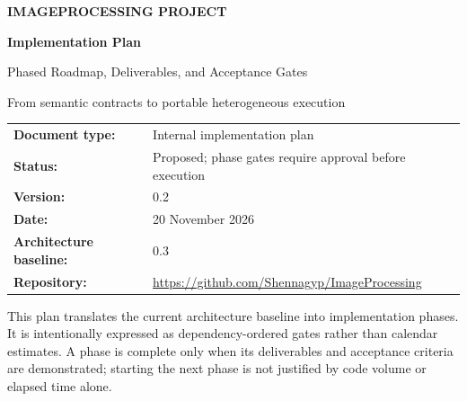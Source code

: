 \documentclass[11pt,a4paper,oneside]{article}
\begin{document}
\begin{titlepage}
  \centering
  \vspace*{19mm}
  {\Large\bfseries IMAGEPROCESSING PROJECT\par}
  \vspace{14mm}
  {\huge\bfseries Implementation Plan\par}
  \vspace{4mm}
  {\LARGE Phased Roadmap, Deliverables, and Acceptance Gates\par}
  \vspace{10mm}
  {\large From semantic contracts to portable heterogeneous execution\par}
  \vfill
  \begin{tabular}{@{}ll@{}}
    \textbf{Document type:} & Internal implementation plan \\
    \textbf{Status:} & Proposed; phase gates require approval before execution \\
    \textbf{Version:} & 0.2 \\
    \textbf{Date:} & 20 November 2026 \\
    \textbf{Architecture baseline:} & 0.3 \\
    \textbf{Repository:} & \url{https://github.com/Shennagyp/ImageProcessing} \\
  \end{tabular}
  \vfill
  \begin{minipage}{0.87\textwidth}
    \small\color{muted}
    This plan translates the current architecture baseline into implementation phases. It is intentionally expressed as dependency-ordered gates rather than calendar estimates. A phase is complete only when its deliverables and acceptance criteria are demonstrated; starting the next phase is not justified by code volume or elapsed time alone.
  \end{minipage}
  \vspace*{13mm}
\end{titlepage}

\clearpage
{}
\tableofcontents
\clearpage
{}






\end{document}
